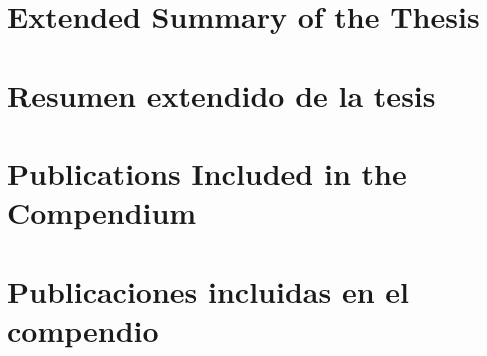 
  {\part{Extended Summary of the Thesis}}
  {\part{Resumen extendido de la tesis}}
\label{part:compendium-summary}










  {\part{Publications Included in the Compendium}}
  {\part{Publicaciones incluidas en el compendio}}
\label{part:compendium-publications}


